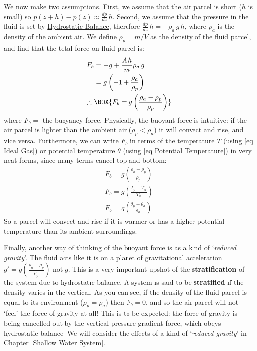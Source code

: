 We now make two assumptions. First, we assume that the air parcel is short (\(h\) is small) so \(p(z+h)-p(z)\approx \frac{dp}{dz}\, h\). Second, we assume that the pressure in the fluid is set by \hyperref[Hydrostatic Balance]{Hydrostatic Balance}, therefore \(\frac{dp}{dz}\, h=-\rho_a\, g\, h\), where \(\rho_a\) is the density of the ambient air. We define \(\rho_p=m/V\) as the density of the fluid parcel, and find that the total force on fluid parcel  is:
\begin{align}
    F_b&=-g+\frac{A\,h}{m}\rho_a\,g\nonumber\\
    &=g\left( -1+ \frac{\rho_a}{\rho_p}\right)\nonumber\\
    \label{Buoyancy Force}
    \therefore \,\,& \BOX{F_b=g\left( \frac{\rho_a-\rho_p}{\rho_p} \right)}
\end{align}
where \(F_b=\) the buoyancy force. Physically, the buoyant force is intuitive: if the air parcel is lighter than the ambient air (\(\rho_p<\rho_a\)) it will convect and rise, and vice versa. Furthermore, we can write \(F_b\) in terms of the temperature \(T\) (using \ref{eq Ideal Gas}) or potential temperature \(\theta\) (using \ref{eq Potential Temperature}) in very neat forms, since many terms cancel top and bottom:
\begin{align}
    F_b=g\left( \frac{\rho_a-\rho_p}{\rho_p} \right)\nonumber\\
    \label{Buoyancy Force Temp}
    \boxed{F_b=g\left( \frac{T_p-T_a}{T_a} \right)}\\
    \boxed{F_b=g\left( \frac{\theta_p-\theta_a}{\theta_a} \right)}
\end{align}
So a parcel will convect and rise if it is warmer or has a higher potential temperature than its ambient surroundings.

Finally, another way of thinking of the buoyant force is as a kind of `\textit{reduced gravity}'. The fluid acts like it is on a planet of gravitational acceleration \(g'=g\left( \frac{\rho_a-\rho_p}{\rho_p} \right)\) not \(g\). This is a very important upshot of the \textbf{stratification} of the system due to hydrostatic balance. A system is said to be \textbf{stratified} if the density varies in the vertical. As you can see, if the density of the fluid parcel is equal to its environment (\(\rho_p = \rho_a\)) then \(F_b=0\), and so the air parcel will not `feel' the force of gravity at all! This is to be expected: the force of gravity is being cancelled out by the vertical pressure gradient force, which obeys hydrostatic balance. We will consider the effects of a kind of `\textit{reduced gravity}' in Chapter \ref{Shallow Water System}.

